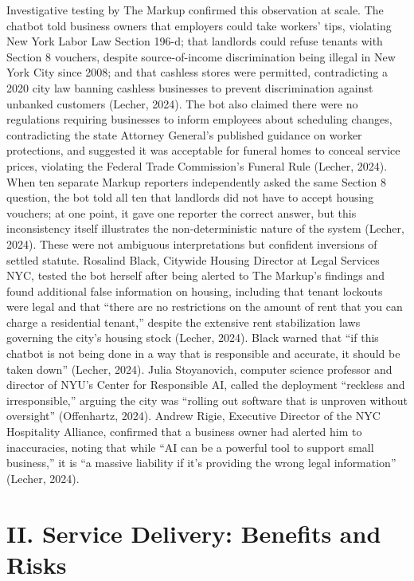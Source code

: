 \documentclass[10pt, twocolumn]{article}
\begin{document}
Investigative testing by The Markup confirmed this observation at scale. The chatbot told business owners that employers could take workers' tips, violating New York Labor Law Section 196-d; that landlords could refuse tenants with Section 8 vouchers, despite source-of-income discrimination being illegal in New York City since 2008; and that cashless stores were permitted, contradicting a 2020 city law banning cashless businesses to prevent discrimination against unbanked customers (Lecher, 2024). The bot also claimed there were no regulations requiring businesses to inform employees about scheduling changes, contradicting the state Attorney General's published guidance on worker protections, and suggested it was acceptable for funeral homes to conceal service prices, violating the Federal Trade Commission's Funeral Rule (Lecher, 2024). When ten separate Markup reporters independently asked the same Section 8 question, the bot told all ten that landlords did not have to accept housing vouchers; at one point, it gave one reporter the correct answer, but this inconsistency itself illustrates the non-deterministic nature of the system (Lecher, 2024). These were not ambiguous interpretations but confident inversions of settled statute. Rosalind Black, Citywide Housing Director at Legal Services NYC, tested the bot herself after being alerted to The Markup's findings and found additional false information on housing, including that tenant lockouts were legal and that ``there are no restrictions on the amount of rent that you can charge a residential tenant,'' despite the extensive rent stabilization laws governing the city's housing stock (Lecher, 2024). Black warned that ``if this chatbot is not being done in a way that is responsible and accurate, it should be taken down'' (Lecher, 2024). Julia Stoyanovich, computer science professor and director of NYU's Center for Responsible AI, called the deployment ``reckless and irresponsible,'' arguing the city was ``rolling out software that is unproven without oversight'' (Offenhartz, 2024). Andrew Rigie, Executive Director of the NYC Hospitality Alliance, confirmed that a business owner had alerted him to inaccuracies, noting that while ``AI can be a powerful tool to support small business,'' it is ``a massive liability if it's providing the wrong legal information'' (Lecher, 2024).

\section*{II. Service Delivery: Benefits and Risks}
\end{document}
